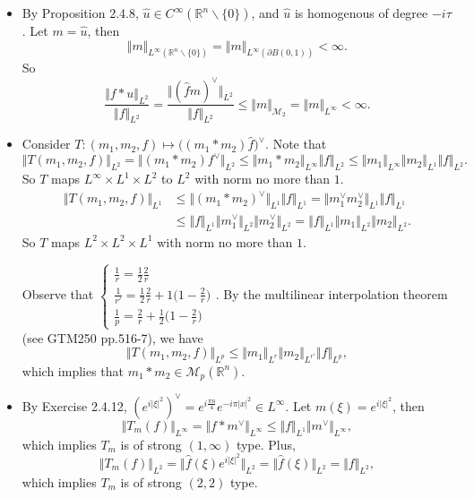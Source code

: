 \begin{itemize}
\item[2.5.11]

By Proposition 2.4.8, $\hat{u}\in C^\infty(\mathbb{R}^n\backslash\{0\})$, 
and $\hat{u} $ is homogenous of degree $-i\tau$. Let $m=\hat{u}$, then
$$\Vert m\Vert_{L^\infty(\mathbb{R}^n\backslash\{0\})} 
=\Vert m\Vert _{L^\infty(\partial B(0,1))}<\infty.$$
So $$\frac{\Vert f*u\Vert_{L^2}}{\Vert f\Vert_{L^2}}
=\frac{\Vert (\hat{f}m)^\vee\Vert_{L^2}}{\Vert f\Vert_{L^2}}
\leq \Vert m\Vert_{\mathscr{M}_2}=\Vert m\Vert _{L^\infty}<\infty.$$

\item[2.5.12]

Consider $T:(m_1,m_2,f)\mapsto \big((m_1*m_2)\hat{f}\big)^\vee$. Note that
$$\Vert T(m_1,m_2,f)\Vert_{L^2}=\Vert (m_1*m_2)f^\vee\Vert_{L^2}
\leq \Vert m_1*m_2\Vert_{L^\infty}\Vert f\Vert_{L^2}
\leq \Vert m_1\Vert_{L^\infty}\Vert m_2\Vert _{L^1}\Vert f\Vert_{L^2}.$$
So $T$ maps $L^\infty\times L^1\times L^2$ to $L^2$ with norm no more than $1$.
\begin{align*}
    \Vert T(m_1,m_2,f)\Vert_{L^1}&\leq \Vert (m_1*m_2)^\vee\Vert_{L^1}\Vert f\Vert_{L^1}
    =\Vert m_1^\vee m_2^\vee\Vert_{L^1}\Vert f\Vert_{L^1}\\
    &\leq\Vert f\Vert_{L^1}\Vert m_1^\vee \Vert_{L^2}\Vert  m_2^\vee\Vert_{L^2}
    =\Vert f\Vert_{L^1}\Vert m_1\Vert_{L^2}\Vert  m_2\Vert_{L^2}.
\end{align*}
So $T$ maps $L^2\times L^2\times L^1$ with norm no more than $1$.

Observe that
$\begin{cases}
\frac{1}{r}=\frac12\frac2r\\
\frac1{r'}\!=\frac12\frac2r+1\big(1-\frac2r\big)\\
\frac{1}{p}=\frac2r+\frac12\big(1-\frac2r\big)\end{cases}$. 
By the multilinear interpolation theorem (see GTM250 pp.516-7), we have
$$\Vert T(m_1,m_2,f)\Vert_{L^p}
\leq \Vert m_1\Vert_{L^r}\Vert m_2\Vert_{L^{r'}}\Vert f\Vert_{L^p},$$
which implies that $m_1*m_2 \in \mathscr{M}_p(\mathbb{R}^n).$

\item[2.5.13]

By Exercise 2.4.12, $(e^{i\vert \xi\vert^2})^\vee
=e^{i\frac{\pi n}{4}}e^{-i\pi|x|^2}\in L^\infty $. 
Let $m(\xi) =e^{i\vert\xi\vert^2}$, then
$$\Vert T_m(f)\Vert _{L^\infty}=\Vert f*m^\vee\Vert_{L^\infty}
\leq \Vert f\Vert_{L^1}\Vert m^\vee\Vert_{L^\infty},$$
which implies $T_m$ is of strong $(1,\infty)$ type. Plus,
$$\Vert T_m(f)\Vert_{L^2}= \Vert \hat{f}(\xi)e^{i\vert \xi \vert^2}\Vert _{L^2}
=\Vert \hat{f}(\xi)\Vert _{L^2}=\Vert f\Vert _{L^2},$$
which implies $T_m$ is of strong $(2,2)$ type.


\end{itemize}
